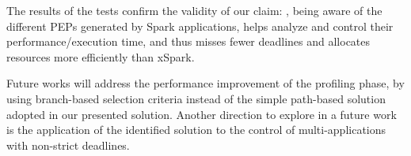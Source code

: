 The results of the tests confirm the validity of our claim: \tool, being aware of the different PEPs generated by Spark applications, helps analyze and control their performance/execution time, and thus misses fewer deadlines and allocates resources more efficiently than xSpark.

Future works will address the performance improvement of the profiling phase, by using branch-based selection criteria instead of the simple path-based solution adopted in our presented solution. Another direction to explore in a future work is the application of the identified solution to the control of multi-\plan applications with non-strict deadlines.
